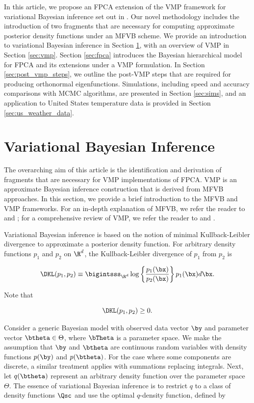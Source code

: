 \documentclass[12pt]{article}
\theoremstyle{plain}
\theoremstyle{definition}
\theoremstyle{remark}
\begin{document}
In this article, we propose an FPCA extension of the VMP framework for variational Bayesian inference set out in
. Our novel methodology includes the introduction of two fragments  that are necessary for
computing approximate posterior density functions under an MFVB scheme. We provide an introduction to
variational Bayesian inference in Section \ref{sec:vbi}, with an overview of VMP in Section \ref{sec:vmp}.
Section \ref{sec:fpca} introduces the Bayesian hierarchical model for FPCA and its extensions under a
VMP formulation. In Section \ref{sec:post_vmp_steps}, we outline the post-VMP steps that are required for
producing orthonormal eigenfunctions. Simulations, including speed and accuracy comparisons with MCMC
algorithms, are presented in Section \ref{sec:sims}, and an application to United States temperature data is
provided in Section \ref{sec:us_weather_data}.


\section{Variational Bayesian Inference}
\label{sec:vbi}

The overarching aim of this article is the identification and derivation of fragments that are necessary for VMP
implementations of FPCA. VMP is an approximate Bayesian inference construction that is derived from MFVB
approaches. In this section, we provide a brief introduction to the MFVB and VMP frameworks. For an in-depth
explanation of MFVB, we refer the reader to  and ; for a comprehensive review
of VMP, we refer the reader to  and .

Variational Bayesian inference is based on the notion of minimal Kullback-Leibler divergence to approximate a
posterior density function. For arbitrary density functions $p_1$
and $p_2$ on $\R^d$, the Kullback-Leibler divergence of $p_1$ from $p_2$ is

\[
	\DKL (p_1, p_2) \equiv \bigintsss_{\R^d} \log \left\{ \frac{p_1 (\bx)}{p_2 (\bx)} \right\} p_1 (\bx) d\bx.
\]

\noindent Note that

\begin{equation}
	\DKL (p_1, p_2) \ge 0.
\label{nonneg_dkl}
\end{equation}

Consider a generic Bayesian model with observed data vector $\by$ and parameter vector $\btheta \in \Theta$,
where $\bTheta$ is a parameter space. We make the
assumption that $\by$ and $\btheta$ are continuous random variables with density functions $p(\by)$ and $p(\btheta)$.
For the case where some components are discrete, a similar treatment applies with summations replacing integrals.
Next, let $q (\btheta)$ represent an arbitrary density function over the parameter space $\Theta$. The essence of
variational Bayesian inference is to restrict $q$ to a class of density functions $\Qsc$ and use the optimal $q$-density
function, defined by
\end{document}
